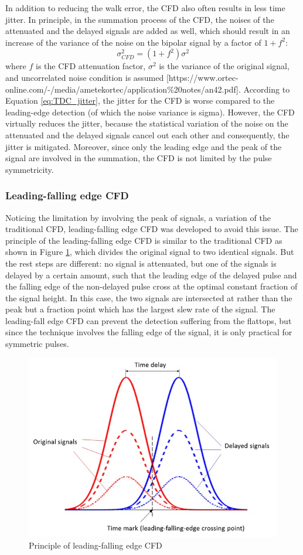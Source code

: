In addition to reducing the walk error, the CFD also often results in less time jitter. In principle, in the summation process of the CFD, the noises of the attenuated and the delayed signals are added as well, which should result in an increase of the variance of the noise on the bipolar signal by a factor of $1+f^2$:
$$
\sigma_{CFD}^2=(1+f^2)\sigma^2
$$
where $f$ is the CFD attenuation factor, $\sigma^2$ is the variance of the original signal, and uncorrelated noise condition is assumed [https://www.ortec-online.com/-/media/ametekortec/application\%20notes/an42.pdf]. According to Equation \eqref{eq:TDC_jitter}, the jitter for the CFD is worse compared to the leading-edge detection (of which the noise variance is sigma). However, the CFD virtually reduces the jitter, because the statistical variation of the noise on the attenuated and the delayed signals cancel out each other and consequently, the jitter is mitigated. Moreover, since only the leading edge and the peak of the signal are involved in the summation, the CFD is not limited by the pulse symmetricity. 
\subsubsection{Leading-falling edge CFD}
Noticing the limitation by involving the peak of signals, a variation of the traditional CFD, leading-falling edge CFD was developed to avoid this issue. The principle of the leading-falling edge CFD is similar to the traditional CFD as shown in Figure \ref{fig:cfd_leadFall}, which divides the original signal to two identical signals. But the rest steps are different: no signal is attenuated, but one of the signals is delayed by a certain amount, such that the leading edge of the delayed pulse and the falling edge of the non-delayed pulse cross at the optimal constant fraction of the signal height. In this case, the two signals are intersected at rather than the peak but a fraction point which has the largest slew rate of the signal. The leading-fall edge CFD can prevent the detection suffering from the flattops, but since the technique involves the falling edge of the signal, it is only practical for symmetric pulses. 
\begin{figure}[t!p]
\centering
\includegraphics[width=.8\textwidth]{figures/chapter3_TDC/cfd_leadFall.jpg}
\caption{Principle of leading-falling edge CFD}
\label{fig:cfd_leadFall}
\end{figure}
